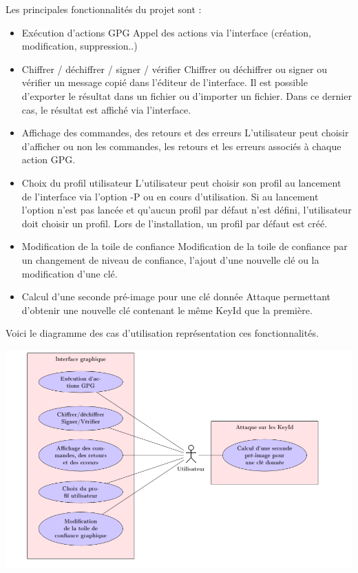 \documentclass{../res/univ-projet}
\begin{document}
  Les principales fonctionnalités du projet sont : \medbreak
  \begin{itemize}
  \item Exécution d'actions GPG \smallbreak
  Appel des actions via l'interface (création, modification, suppression..) \smallbreak
  \item Chiffrer / déchiffrer / signer / vérifier \smallbreak
  Chiffrer ou déchiffrer ou signer ou vérifier un message copié dans l'éditeur de l'interface. Il est possible d'exporter le résultat dans un fichier ou d'importer un fichier. Dans ce dernier cas, le résultat est affiché via l'interface. \smallbreak
  \item Affichage des commandes, des retours et des erreurs \smallbreak
  L'utilisateur peut choisir d'afficher ou non les commandes, les retours et les erreurs associés à chaque action GPG. \smallbreak 
  \item Choix du profil utilisateur \smallbreak
  L'utilisateur peut choisir son profil au lancement de l'interface via l'option -P ou en cours d'utilisation. Si au lancement l'option n'est pas lancée et qu'aucun profil par défaut n'est défini, l'utilisateur doit choisir un profil. Lors de l'installation, un profil par défaut est créé. \smallbreak
  \item Modification de la toile de confiance \smallbreak
  Modification de la toile de confiance par un changement de niveau de confiance, l'ajout d'une nouvelle clé ou la modification d'une clé. \smallbreak
  \item Calcul d'une seconde pré-image pour une clé donnée \smallbreak
  Attaque permettant d'obtenir une nouvelle clé contenant le même KeyId que la première.
  \end{itemize}
  
  \medbreak
  
  Voici le diagramme des cas d'utilisation représentation ces fonctionnalités.
  
  \includegraphics[scale=0.4]{usecase.png}
  
\end{document}
